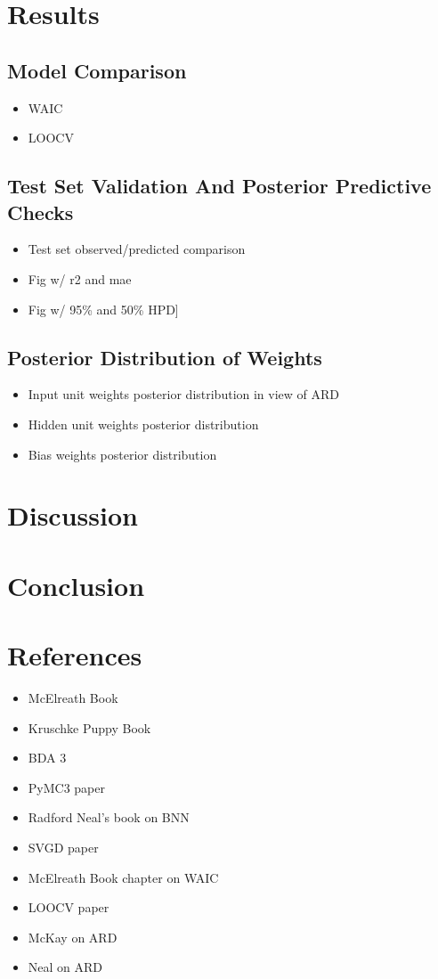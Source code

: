 \documentclass[10pt,a4paper]{article}
\begin{document}
	\section{Results}
		\subsection{Model Comparison}
			\begin{itemize}
				\item WAIC
				\item LOOCV
			\end{itemize}
		\subsection{Test Set Validation And Posterior Predictive Checks}
			\begin{itemize}
				\item Test set observed/predicted comparison 
				\item Fig w/ r2 and mae
				\item Fig w/ 95\% and 50\% HPD]
			\end{itemize}
		\subsection{Posterior Distribution of Weights}
			\begin{itemize}
				\item Input unit weights posterior distribution in view of ARD
				\item Hidden unit weights posterior distribution
				\item Bias weights posterior distribution
			\end{itemize}
	\newpage
	\section{Discussion}
	\newpage
	\section{Conclusion}
	\newpage
	\section{References}
		\begin{itemize}
			\item McElreath Book
			\item Kruschke Puppy Book
			\item BDA 3
			\item PyMC3 paper
			\item Radford Neal's book on BNN
			\item SVGD paper
			\item McElreath Book chapter on WAIC
			\item LOOCV paper
			\item McKay on ARD
			\item Neal on ARD
		\end{itemize}
\end{document}
